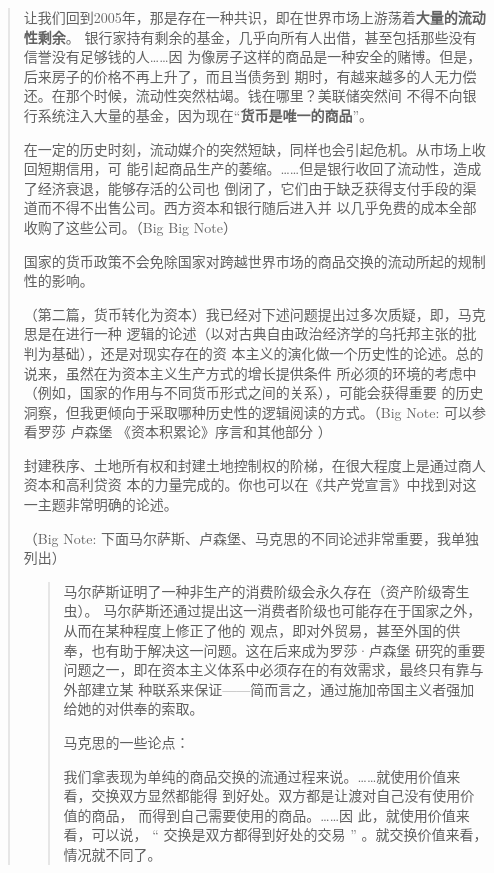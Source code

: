 \begin{quotation}
让我们回到2005年，那是存在一种共识，即在世界市场上游荡着\textbf{大量的流动性剩余}。
银行家持有剩余的基金，几乎向所有人出借，甚至包括那些没有信誉没有足够钱的人……因
为像房子这样的商品是一种安全的赌博。但是，后来房子的价格不再上升了，而且当债务到
期时，有越来越多的人无力偿还。在那个时候，流动性突然枯竭。钱在哪里？美联储突然间
不得不向银行系统注入大量的基金，因为现在“\textbf{货币是唯一的商品}”。

在一定的历史时刻，流动媒介的突然短缺，同样也会引起危机。从市场上收回短期信用，可
能引起商品生产的萎缩。……但是银行收回了流动性，造成了经济衰退，能够存活的公司也
倒闭了，它们由于缺乏获得支付手段的渠道而不得不出售公司。西方资本和银行随后进入并
以几乎免费的成本全部收购了这些公司。（Big Big
Note）

国家的货币政策不会免除国家对跨越世界市场的商品交换的流动所起的规制性的影响。

（第二篇，货币转化为资本）我已经对下述问题提出过多次质疑，即，马克思是在进行一种
逻辑的论述（以对古典自由政治经济学的乌托邦主张的批判为基础），还是对现实存在的资
本主义的演化做一个历史性的论述。总的说来，虽然在为资本主义生产方式的增长提供条件
所必须的环境的考虑中（例如，国家的作用与不同货币形式之间的关系），可能会获得重要
的历史洞察，但我更倾向于采取哪种历史性的逻辑阅读的方式。（Big Note: 可以参看罗莎
卢森堡 《资本积累论》序言和其他部分 ）

封建秩序、土地所有权和封建土地控制权的阶梯，在很大程度上是通过商人资本和高利贷资
本的力量完成的。你也可以在《共产党宣言》中找到对这一主题非常明确的论述。

（Big Note: 下面马尔萨斯、卢森堡、马克思的不同论述非常重要，我单独列出）
\begin{quotation}马尔萨斯证明了一种非生产的消费阶级会永久存在（资产阶级寄生虫）。
马尔萨斯还通过提出这一消费者阶级也可能存在于国家之外，从而在某种程度上修正了他的
观点，即对外贸易，甚至外国的供奉，也有助于解决这一问题。这在后来成为罗莎·卢森堡
研究的重要问题之一，即在资本主义体系中必须存在的有效需求，最终只有靠与外部建立某
种联系来保证——简而言之，通过施加帝国主义者强加给她的对供奉的索取。

\bigskip 马克思的一些论点：

我们拿表现为单纯的商品交换的流通过程来说。……就使用价值来看，交换双方显然都能得
到好处。双方都是让渡对自己没有使用价值的商品， 而得到自己需要使用的商品。……因
此，就使用价值来看，可以说， “ 交换是双方都得到好处的交易 ” 。就交换价值来看，
情况就不同了。


\end{quotation}
\end{quotation}
